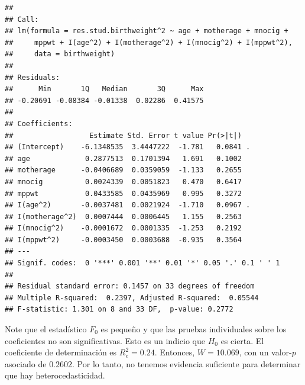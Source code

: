 \documentclass[
]{article}
\newenvironment{Shaded}{\begin{snugshade}}{\end{snugshade}}
\newcommand{\AttributeTok}[1]{\textcolor[rgb]{0.77,0.63,0.00}{#1}}
\newcommand{\DecValTok}[1]{\textcolor[rgb]{0.00,0.00,0.81}{#1}}
\newcommand{\FunctionTok}[1]{\textcolor[rgb]{0.00,0.00,0.00}{#1}}
\newcommand{\NormalTok}[1]{#1}
\newcommand{\OtherTok}[1]{\textcolor[rgb]{0.56,0.35,0.01}{#1}}
\newcommand{\SpecialCharTok}[1]{\textcolor[rgb]{0.00,0.00,0.00}{#1}}
\begin{document}
\begin{Shaded}
\end{Shaded}

\begin{verbatim}
## 
## Call:
## lm(formula = res.stud.birthweight^2 ~ age + motherage + mnocig + 
##     mppwt + I(age^2) + I(motherage^2) + I(mnocig^2) + I(mppwt^2), 
##     data = birthweight)
## 
## Residuals:
##      Min       1Q   Median       3Q      Max 
## -0.20691 -0.08384 -0.01338  0.02286  0.41575 
## 
## Coefficients:
##                  Estimate Std. Error t value Pr(>|t|)  
## (Intercept)    -6.1348535  3.4447222  -1.781   0.0841 .
## age             0.2877513  0.1701394   1.691   0.1002  
## motherage      -0.0406689  0.0359059  -1.133   0.2655  
## mnocig          0.0024339  0.0051823   0.470   0.6417  
## mppwt           0.0433585  0.0435969   0.995   0.3272  
## I(age^2)       -0.0037481  0.0021924  -1.710   0.0967 .
## I(motherage^2)  0.0007444  0.0006445   1.155   0.2563  
## I(mnocig^2)    -0.0001672  0.0001335  -1.253   0.2192  
## I(mppwt^2)     -0.0003450  0.0003688  -0.935   0.3564  
## ---
## Signif. codes:  0 '***' 0.001 '**' 0.01 '*' 0.05 '.' 0.1 ' ' 1
## 
## Residual standard error: 0.1457 on 33 degrees of freedom
## Multiple R-squared:  0.2397, Adjusted R-squared:  0.05544 
## F-statistic: 1.301 on 8 and 33 DF,  p-value: 0.2772
\end{verbatim}

Note que el estadístico \(F_{0}\) es pequeño y que las pruebas individuales sobre los coeficientes no son significativas. Esto es un indicio que \(H_{0}\) es cierta. El coeficiente de determinación es \(R_{e}^{2} = 0.24\). Entonces, \(W= 10.069\), con un valor-\(p\) asociado de \(0.2602\). Por lo tanto, no tenemos evidencia suficiente para determinar que hay heterocedasticidad.
\end{document}
